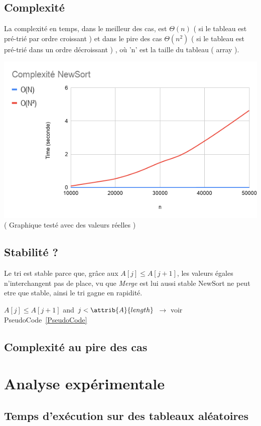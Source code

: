 \documentclass[a4paper, 11pt, oneside]{article}
\begin{document}
\subsection{Complexité}
La complexité en temps, dans le meilleur des cas, est $\Theta(n)$ ( si le tableau est pré-trié par ordre croissant ) et dans le pire des cas $\Theta(n^{2})$ ( si le tableau est pré-trié dans un ordre décroissant ) , où 'n' est la taille du tableau ( array ).

\includegraphics[scale=0.5]{graphique.png} \\
( Graphique testé avec des valeurs réelles ) %


\subsection{Stabilité ?}
Le tri est stable parce que, grâce aux $A[j]\leq A[j+1]$, les valeurs égales n'interchangent pas de place, vu que \textit{Merge} est lui aussi stable NewSort ne peut etre que stable, ainsi le tri gagne en rapidité.
	\begin{codebox}

\li \While $A[j] \leq A[j+1]$ and $j < \attrib{A}{length}$
$\longrightarrow$ voir PseudoCode~\ref{PseudoCode}
\End
\end{codebox} 
\newpage
\subsection{Complexité au pire des cas}
\newpage

\section{Analyse expérimentale}
\subsection{Temps d'exécution sur des tableaux aléatoires}
\end{document}
